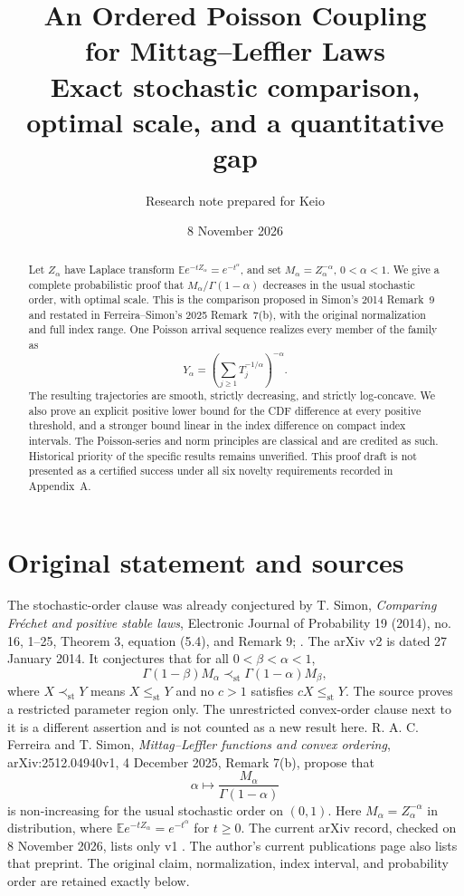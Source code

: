 \documentclass[11pt,a4paper]{article}
\title{\textbf{An Ordered Poisson Coupling\\for Mittag--Leffler Laws}\\[5pt]
\large Exact stochastic comparison, optimal scale, and a quantitative gap}
\author{Research note prepared for Keio}
\date{8 November 2026}
\begin{document}
\maketitle
\begin{abstract}
Let \(Z_\alpha\) have Laplace transform
\(\mathbb E e^{-tZ_\alpha}=e^{-t^\alpha}\), and set
\(M_\alpha=Z_\alpha^{-\alpha}\), \(0<\alpha<1\).
We give a complete probabilistic proof that
\(M_\alpha/\Gamma(1-\alpha)\) decreases in the usual stochastic order,
with optimal scale. This is the comparison proposed in Simon's 2014
Remark~9 and restated in Ferreira--Simon's 2025 Remark~7(b), with the
original normalization and full index range.
One Poisson arrival sequence realizes every member of the family as
\[
Y_\alpha=\left(\sum_{j\geq1}T_j^{-1/\alpha}\right)^{-\alpha}.
\]
The resulting trajectories are smooth, strictly decreasing, and
strictly log-concave. We also prove an explicit positive lower bound
for the CDF difference at every positive threshold, and a stronger
bound linear in the index difference on compact index intervals.
The Poisson-series and norm principles are classical and are credited
as such. Historical priority of the specific results remains unverified.
This proof draft is not presented as a certified success under all six
novelty requirements recorded in Appendix~A.
\end{abstract}
\section{Original statement and sources}
The stochastic-order clause was already conjectured by T. Simon,
\emph{Comparing Fr\'echet and positive stable laws}, Electronic Journal
of Probability 19 (2014), no. 16, 1--25, Theorem 3, equation (5.4),
and Remark 9; \cite{Simon}. The arXiv v2 is dated
27 January 2014. It conjectures that for all $0<\beta<\alpha<1$,
\[
 \Gamma(1-\beta)M_\alpha
     \prec_{\mathrm{st}}\Gamma(1-\alpha)M_\beta,
\]
where $X\prec_{\mathrm{st}}Y$ means $X\leq_{\mathrm{st}}Y$ and no
$c>1$ satisfies $cX\leq_{\mathrm{st}}Y$. The source proves a restricted
parameter region only. The unrestricted convex-order clause next to
it is a different assertion and is not counted as a new result here.
R. A. C. Ferreira and T. Simon, \emph{Mittag--Leffler functions and convex
ordering}, arXiv:2512.04940v1, 4 December 2025, Remark 7(b), propose that
\[
  \alpha\longmapsto \frac{M_\alpha}{\Gamma(1-\alpha)}
\]
is non-increasing for the usual stochastic order on $(0,1)$.
Here $M_\alpha=Z_\alpha^{-\alpha}$ in distribution, where
$\mathbb E e^{-tZ_\alpha}=e^{-t^\alpha}$ for $t\geq0$.
The current arXiv record, checked on 8 November 2026, lists only v1 \cite{FS}.
The author's current publications page also lists that preprint.
The original claim, normalization, index interval, and probability order
are retained exactly below.
\end{document}

